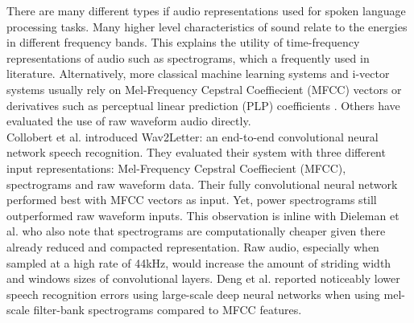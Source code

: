 There are many different types if audio representations used for spoken language processing tasks. Many higher level characteristics of sound relate to the energies in different frequency bands. This explains the utility of time-frequency representations of audio such as spectrograms, which a frequently used in literature.\cite{montavon2009deep, dieleman2013multiscale, lee2009unsupervised, wulfing2012unsupervised, henaff2011unsupervised} Alternatively, more classical machine learning systems and i-vector systems usually rely on Mel-Frequency Cepstral Coeffiecient (MFCC) vectors\cite{richardson2015unified, dehak2011front, garcia2011analysis} or derivatives such as perceptual linear prediction (PLP) coefficients \cite{gonzalez2014automatic}. Others have evaluated the use of raw waveform audio directly\cite{dieleman2014end, collobert2016wav2letter}.\\
Collobert et al. introduced Wav2Letter\cite{collobert2016wav2letter}: an end-to-end convolutional neural network speech recognition. They evaluated their system with three different input representations: Mel-Frequency Cepstral Coeffiecient (MFCC), spectrograms and raw waveform data. Their fully convolutional neural network performed best with MFCC vectors as input. Yet, power spectrograms still outperformed raw waveform inputs. This observation is inline with Dieleman et al.\cite{dieleman2014end} who also note that spectrograms are computationally cheaper given there already reduced and compacted representation. Raw audio, especially when sampled at a high rate of 44kHz, would increase the amount of striding width and windows sizes of convolutional layers.  
Deng et al. \cite{deng2013recent} reported noticeably lower speech recognition errors using large-scale deep neural networks when using mel-scale filter-bank spectrograms compared to MFCC features. 


